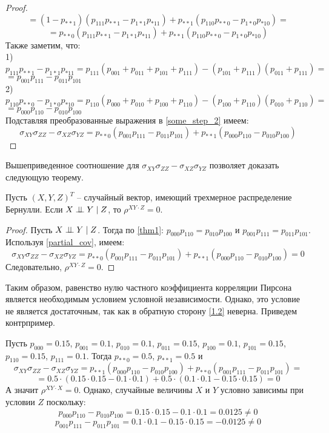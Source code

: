 \begin{proof}
$$    $$
    $$
        =(1-p_{**1})(p_{111}p_{**1}-p_{1*1}p_{*11})+p_{**1}(p_{110}p_{**0}-p_{1*0}p_{*10})=
    $$
    \begin{equation}\label{some_step_2}
        =p_{**0}(p_{111}p_{**1}-p_{1*1}p_{*11})+p_{**1}(p_{110}p_{**0}-p_{1*0}p_{*10})
    \end{equation}
    Также заметим, что:\\
    1) $
        p_{111}p_{**1}-p_{1*1}p_{*11} = p_{111}(p_{001}+p_{011}+p_{101}+p_{111})-
        (p_{101}+p_{111})(p_{011}+p_{111})=
    $
    $
        = p_{001}p_{111}-p_{011}p_{101}
    $
    \\
    2) $
        p_{110}p_{**0}-p_{1*0}p_{*10}=
        p_{110}(p_{000}+p_{010}+p_{100}+p_{110})-(p_{100}+p_{110})(p_{010}+p_{110})=
    $
    $
        =p_{000}p_{110}-p_{010}p_{100}
    $\\
    Подставляя преобразованные выражения в \eqref{some_step_2} имеем:
    $$
    \sigma_{XY} \sigma_{ZZ} - \sigma_{XZ} \sigma_{YZ} = p_{**0}(p_{001}p_{111}-p_{011}p_{101}) + p_{**1} (p_{000}p_{110}-p_{010}p_{100})
    $$
\end{proof}
Вышеприведенное соотношение для $\sigma_{XY} \sigma_{ZZ} - \sigma_{XZ} \sigma_{YZ}$ позволяет доказать следующую теорему.
\begin{theorem}\label{1.2}
    Пусть $(X,Y,Z)^T$ -- случайный вектор, имеющий трехмерное распределение Бернулли.
    Если $X \perp\!\!\!\perp Y \mid Z$, то $\rho^{XY \cdot Z}=0$.
\end{theorem}
\begin{proof}
    Пусть $X \perp\!\!\!\perp Y \mid Z$. Тогда по \autoref{thm1}:
    $p_{000}p_{110}=p_{010}p_{100}$ и 
    $p_{001}p_{111}=p_{011}p_{101}$.
    Используя \autoref{partial_cov}, имеем:
    $$
    \sigma_{XY} \sigma_{ZZ} - \sigma_{XZ} \sigma_{YZ}=p_{**0}(p_{001}p_{111}-p_{011}p_{101}) + p_{**1} (p_{000}p_{110}-p_{010}p_{100})= 0
    $$
    Следовательно, $\rho^{XY \cdot Z}=0$.
\end{proof}
Таким образом, равенство нулю частного коэффициента корреляции Пирсона является необходимым условием условной независимости.
Однако, это условие не является достаточным, так как в обратную сторону \autoref{1.2} неверна. Приведем контрпример.
\begin{example}
    Пусть $p_{000}=0.15$, $p_{001}=0.1$, $p_{010}=0.1$, $p_{011}=0.15$, $p_{100}=0.1$, $p_{101}=0.15$, $p_{110}=0.15$, $p_{111}=0.1$.
    Тогда $p_{**0}=0.5$, $p_{**1}=0.5$ и
    $$\sigma_{XY} \sigma_{ZZ} - \sigma_{XZ} \sigma_{YZ} = p_{**1}(p_{000}p_{110}-p_{010}p_{100}) + p_{**0}(p_{001}p_{111}-p_{011}p_{101})=$$
    $$=0.5 \cdot (0.15 \cdot 0.15 - 0.1 \cdot 0.1) + 0.5 \cdot (0.1 \cdot 0.1 - 0.15 \cdot 0.15) = 0$$
    А значит $\rho^{XY\cdot X}=0$.
    Однако, случайные величины $X$ и $Y$ условно зависимы при условии $Z$ поскольку:
    $$
        p_{000}p_{110}-p_{010}p_{100}=0.15 \cdot 0.15 - 0.1 \cdot 0.1 = 0.0125 \neq 0
    $$
    $$
        p_{001}p_{111}-p_{011}p_{101}=0.1 \cdot 0.1 - 0.15 \cdot 0.15 = -0.0125 \neq 0
    $$
\end{example}

